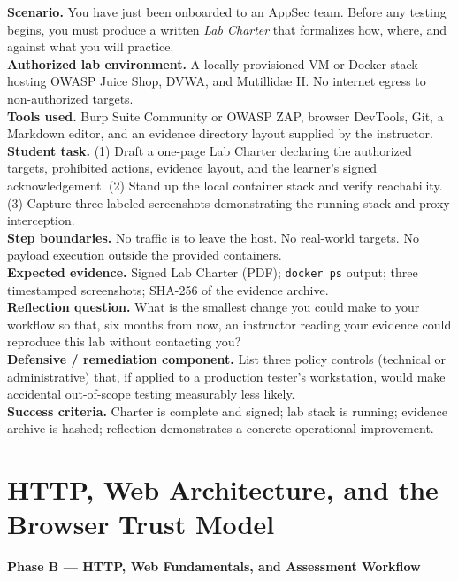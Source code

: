 \documentclass[11pt,letterpaper,oneside]{report}
\newcommand{\tool}[1]{\texttt{\small #1}}
\begin{document}
\begin{labbox}
\textbf{Scenario.} You have just been onboarded to an AppSec team. Before any testing begins, you must produce a written \emph{Lab Charter} that formalizes how, where, and against what you will practice.\\[3pt]
\textbf{Authorized lab environment.} A locally provisioned VM or Docker stack hosting OWASP Juice Shop, DVWA, and Mutillidae II. No internet egress to non-authorized targets.\\[3pt]
\textbf{Tools used.} Burp Suite Community or OWASP ZAP, browser DevTools, Git, a Markdown editor, and an evidence directory layout supplied by the instructor.\\[3pt]
\textbf{Student task.} (1) Draft a one-page Lab Charter declaring the authorized targets, prohibited actions, evidence layout, and the learner's signed acknowledgement. (2) Stand up the local container stack and verify reachability. (3) Capture three labeled screenshots demonstrating the running stack and proxy interception.\\[3pt]
\textbf{Step boundaries.} No traffic is to leave the host. No real-world targets. No payload execution outside the provided containers.\\[3pt]
\textbf{Expected evidence.} Signed Lab Charter (PDF); \tool{docker ps} output; three timestamped screenshots; SHA-256 of the evidence archive.\\[3pt]
\textbf{Reflection question.} What is the smallest change you could make to your workflow so that, six months from now, an instructor reading your evidence could reproduce this lab without contacting you?\\[3pt]
\textbf{Defensive / remediation component.} List three policy controls (technical or administrative) that, if applied to a production tester's workstation, would make accidental out-of-scope testing measurably less likely.\\[3pt]
\textbf{Success criteria.} Charter is complete and signed; lab stack is running; evidence archive is hashed; reflection demonstrates a concrete operational improvement.
\end{labbox}

\chapter{HTTP, Web Architecture, and the Browser Trust Model}
\textbf{Phase B --- HTTP, Web Fundamentals, and Assessment Workflow}
\end{document}
